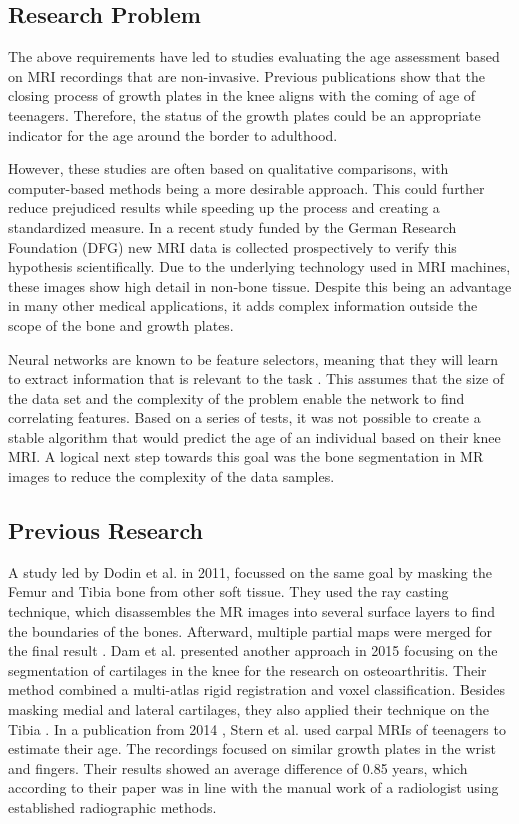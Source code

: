 \subsection{Research Problem}

The above requirements have led to studies evaluating the age assessment based on MRI recordings that are non-invasive. Previous publications \cite{Saring2014, Jopp2007} show that the closing process of growth plates in the knee aligns with the coming of age of teenagers. Therefore, the status of the growth plates could be an appropriate indicator for the age around the border to adulthood.

However, these studies are often based on qualitative comparisons, with computer-based methods being a more desirable approach. This could further reduce prejudiced results while speeding up the process and creating a standardized measure. In a recent study funded by the German Research Foundation (DFG) new MRI data is collected prospectively to verify this hypothesis scientifically. Due to the underlying technology used in MRI machines, these images show high detail in non-bone tissue. Despite this being an advantage in many other medical applications, it adds complex information outside the scope of the bone and growth plates.

Neural networks are known to be feature selectors, meaning that they will learn to extract information that is relevant to the task \cite{Setiono1997}. This assumes that the size of the data set and the complexity of the problem enable the network to find correlating features. Based on a series of tests, it was not possible to create a stable algorithm that would predict the age of an individual based on their knee MRI. A logical next step towards this goal was the bone segmentation in MR images to reduce the complexity of the data samples.

\subsection{Previous Research}

A study led by Dodin et al. in 2011, focussed on the same goal by masking the Femur and Tibia bone from other soft tissue. They used the ray casting technique, which disassembles the MR images into several surface layers to find the boundaries of the bones. Afterward, multiple partial maps were merged for the final result \cite{Dodin2011}. Dam et al. presented another approach in 2015 focusing on the segmentation of cartilages in the knee for the research on osteoarthritis. Their method combined a multi-atlas rigid registration and voxel classification. Besides masking medial and lateral cartilages, they also applied their technique on the Tibia \cite{Dam}. In a publication from 2014 \cite{Stern2014}, Stern et al. used carpal MRIs of teenagers to estimate their age. The recordings focused on similar growth plates in the wrist and fingers. Their results showed an average difference of 0.85 years, which according to their paper was in line with the manual work of a radiologist using established radiographic methods.

